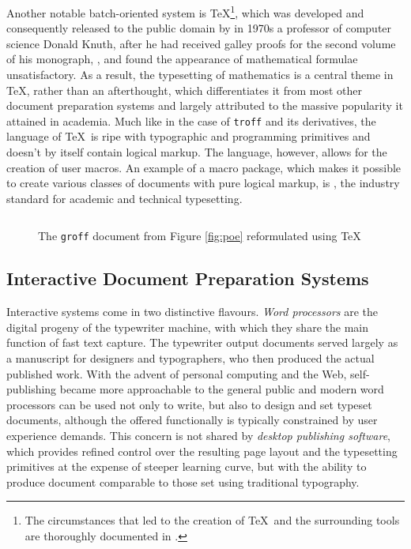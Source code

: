 \documentclass{book}
\begin{document}
Another notable batch-oriented system is \TeX{}\footnote{
  The circumstances that led to the creation of \TeX\ and the surrounding tools
  are thoroughly documented in \cite{knuth98}.
}, which was developed and consequently released to the public domain by in
1970s a professor of computer science Donald Knuth, after he had received galley
proofs for the second volume of his monograph, , and found the appearance of mathematical formulae unsatisfactory.
As a result, the typesetting of mathematics is a central theme in \TeX, rather
than an afterthought, which differentiates it from most other document
preparation systems and largely attributed to the massive popularity it attained
in academia. Much like in the case of \texttt{troff} and its derivatives, the
language of \TeX\ is ripe with typographic and programming primitives and
doesn't by itself contain logical markup. The language, however, allows for the
creation of user macros. An example of a macro package, which makes it possible
to create various classes of documents with pure logical markup, is
\inx{\LaTeX}, the industry standard for academic and technical typesetting.

\begin{figure}
  \inputminted{tex}{examples/02/poe.tex}
  \caption{The \texttt{groff} document from Figure \ref{fig:poe} reformulated
    using \TeX}
\end{figure}

\subsection{Interactive Document Preparation Systems}
Interactive systems come in two distinctive flavours. \emph{Word processors}
 are
the digital progeny of the typewriter machine, with which they share the main
function of fast text capture. The typewriter output documents served largely as
a manuscript for designers and typographers, who then produced the actual
published work. With the advent of personal computing and the Web,
self-publishing became more approachable to the general public and modern word
processors can be used not only to write, but also to design and set typeset
documents, although the offered functionally is typically constrained by user
experience demands. This concern is not shared by \emph{desktop publishing
software},
which provides refined control over the resulting page layout and the
typesetting primitives at the expense of steeper learning curve, but with the
ability to produce document comparable to those set using traditional
typography.
\end{document}
